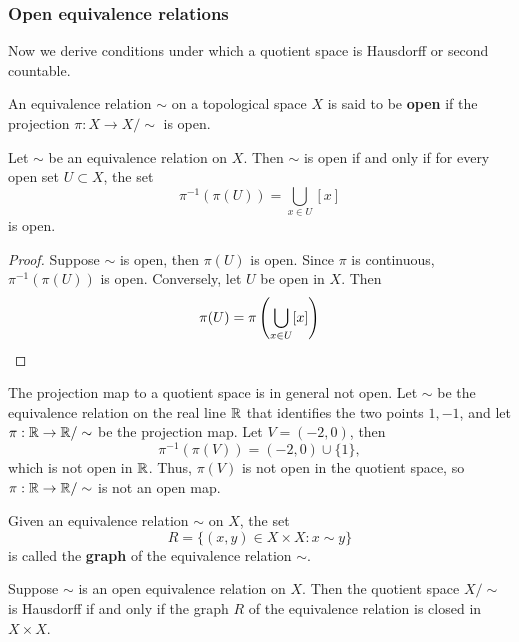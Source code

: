 \subsubsection*{Open equivalence relations}
Now we derive conditions under which a quotient space is Hausdorff or second countable. 
\begin{definition}
    An equivalence relation $\sim$ on a topological space $X$ is said to be \textbf{open} if the projection $\pi:X \to X/\sim$ is open. 
\end{definition}
\begin{proposition}
    Let $\sim$ be an equivalence relation on $X$. Then $\sim$ is open if and only if for every open set $U \subset X$, the set
    $$\pi^{-1}(\pi(U)) = \bigcup_{x\in U} [x]$$
    is open. 
\end{proposition}
\begin{proof}
    Suppose $\sim$ is open, then $\pi(U)$ is open. Since $\pi$ is continuous, $\pi^{-1}(\pi(U))$ is open. Conversely, let $U$ be open in $X$. Then 
    $$\pi(U) = \pi\left(\bigcup_{x\in U} [x]\right) $$
    
\end{proof}
\begin{example} %
    The projection map to a quotient space is in general not open. 
    Let $\sim$ be the equivalence relation on the real line $\mathbb{R}$ that identifies the two points $1, -1$, and let $\pi:\mathbb{R} \to \mathbb{R}/\sim$ be the projection map. 
    Let $V = (-2,0)$, then 
    $$\pi^{-1}(\pi(V)) = (-2,0) \cup \{1\}, $$
    which is not open in $\mathbb{R}$. Thus, $\pi(V)$ is not open in the quotient space, so $\pi:\mathbb{R} \to \mathbb{R}/\sim$ is not an open map. 
\end{example}
\begin{definition}
    Given an equivalence relation $\sim$ on $X$, the set 
    $$R = \{(x,y) \in X \times X: x \sim y\}$$
    is called the \textbf{graph} of the equivalence relation $\sim$. 
\end{definition}
\begin{theorem}
    Suppose $\sim$ is an open equivalence relation on $X$. Then the quotient space $X/\sim$ is Hausdorff if and only if the graph $R$ of the equivalence relation is closed in $X \times X$. 
\end{theorem}

